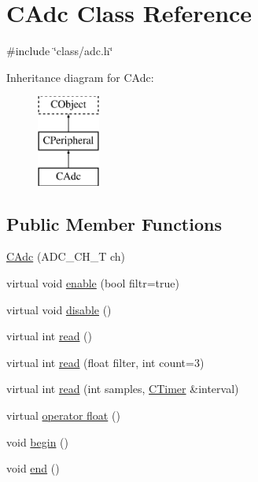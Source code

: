 \hypertarget{class_c_adc}{\section{C\-Adc Class Reference}
\label{class_c_adc}
}


{\ttfamily \#include \char`\"{}class/adc.\-h\char`\"{}}

Inheritance diagram for C\-Adc\-:\begin{figure}[H]
\begin{center}
\leavevmode
\includegraphics[height=3.000000cm]{d7/d0f/class_c_adc}
\end{center}
\end{figure}
\subsection*{Public Member Functions}
\begin{DoxyCompactItemize}
\item 
\hyperlink{class_c_adc_a3d122c0e7fe686958371eabc9ed0db3f}{C\-Adc} (A\-D\-C\-\_\-\-C\-H\-\_\-\-T ch)
\item 
virtual void \hyperlink{class_c_adc_a11f59e83f9a3815e7980273a0b9bdd5b}{enable} (bool filtr=true)
\item 
virtual void \hyperlink{class_c_adc_ad3fc0560a6fbbca6d1cae12b187f98b7}{disable} ()
\item 
virtual int \hyperlink{class_c_adc_aa0748ed4e15aded89101060e388af8be}{read} ()
\item 
virtual int \hyperlink{class_c_adc_a20a6e83792c914309d2b0845e798b4d7}{read} (float filter, int count=3)
\item 
virtual int \hyperlink{class_c_adc_a31643f0558a614c013d476818156a1a1}{read} (int samples, \hyperlink{class_c_timer}{C\-Timer} \&interval)
\item 
virtual \hyperlink{class_c_adc_a678a8b70b4d4a2537c99eaba562e75b8}{operator float} ()
\item 
void \hyperlink{class_c_adc_ad27b537dba363079fc68ee48050183d6}{begin} ()
\item 
void \hyperlink{class_c_adc_a83103970c96cf7f0638bc44a11fa68b6}{end} ()
\end{DoxyCompactItemize}


